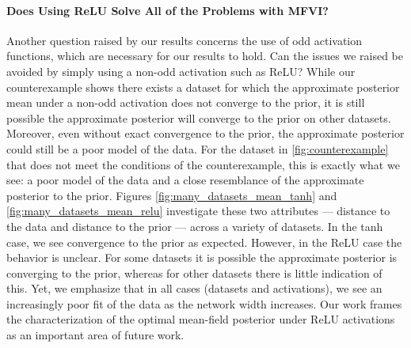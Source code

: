 \documentclass[twoside]{article}
\theoremstyle{theoremstyle}
\begin{document}
\paragraph{Does Using ReLU Solve All of the Problems with MFVI?}
Another question raised by our results concerns the use of odd activation functions, which are necessary for our results to hold. Can the issues we raised be avoided by simply using a non-odd activation such as ReLU? 
While our counterexample shows there exists a dataset for which the approximate posterior mean under a non-odd activation does not converge to the prior, it is still possible the approximate posterior will converge to the prior on other datasets. Moreover, even without exact convergence to the prior, the approximate posterior could still be a poor model of the data. For the dataset in \cref{fig:counterexample} that does not meet the conditions of the counterexample, this is exactly what we see: a poor model of the data and a close resemblance of the approximate posterior to the prior. Figures \ref{fig:many_datasets_mean_tanh} and \ref{fig:many_datasets_mean_relu} investigate these two attributes --- distance to the data and distance to the prior --- across a variety of datasets. In the tanh case, we see convergence to the prior as expected. However, in the ReLU case the behavior is unclear. For some datasets it is possible the approximate posterior is converging to the prior, whereas for other datasets there is little indication of this. Yet, we emphasize that in all cases (datasets and activations), we see an increasingly poor fit of the data as the network width increases.
Our work frames the characterization of the optimal mean-field posterior under ReLU activations as an important area of future work.


\end{document}
